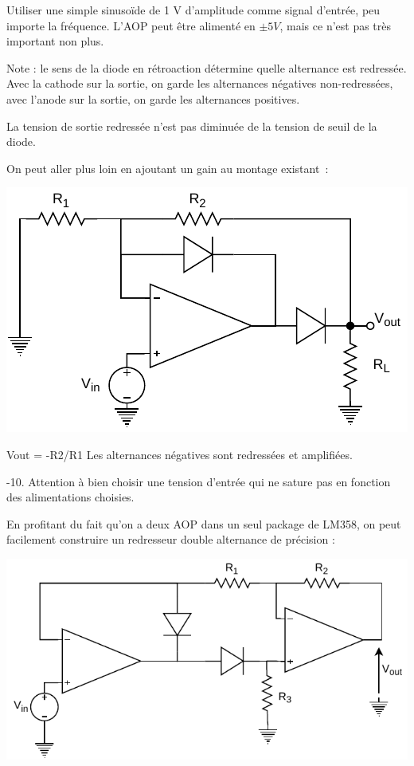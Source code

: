 \documentclass{../../template/labo}
\begin{document}
{
Utiliser une simple sinusoïde de 1 V d'amplitude comme signal d'entrée, peu importe la fréquence.
L'AOP peut être alimenté en $\pm5 V$, mais ce n'est pas très important non plus.

Note : le sens de la diode en rétroaction détermine quelle alternance est redressée. Avec la cathode sur la sortie, on garde les alternances négatives non-redressées, avec l'anode sur la sortie, on garde les alternances positives.
}

{
La tension de sortie redressée n'est pas diminuée de la tension de seuil de la diode.
}


On peut aller plus loin en ajoutant un gain au montage existant~:
\begin{center}
	\includegraphics[width=.7\textwidth]{precision-rectifier-gain.pdf}
\end{center}

{
Vout = -R2/R1
Les alternances négatives sont redressées et amplifiées.
}

{
-10.
Attention à bien choisir une tension d'entrée qui ne sature pas en fonction des alimentations choisies.
}

En profitant du fait qu'on a deux AOP dans un seul package de LM358, on peut facilement construire un redresseur double alternance de précision :
\begin{center}
	\includegraphics[width=.7\textwidth]{precision-rectifier-double.pdf}
\end{center}
\end{document}
